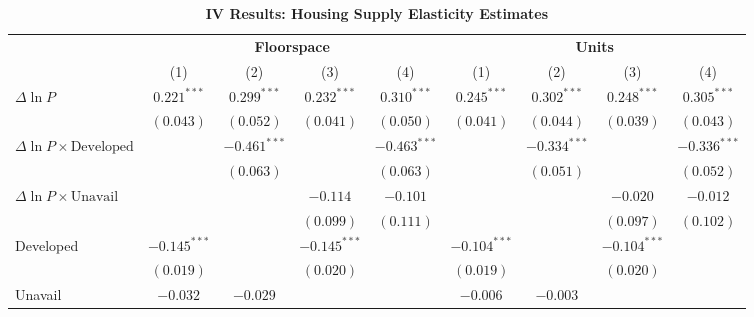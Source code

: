 
\begin{table}[H]
\caption{\textbf{IV Results: Housing Supply Elasticity Estimates}}
\begin{center}
\begin{footnotesize}
\begin{threeparttable}
\begin{tabular}{l@{} c@{} c@{} c@{} c@{} c@{} c@{} c@{} c@{}}
\toprule
 & \multicolumn{4}{c}{\textbf{Floorspace}} & \multicolumn{4}{c}{\textbf{Units}} \\
\cmidrule(lr){2-5} \cmidrule(lr){6-9}
 & (1) & (2) & (3) & (4) & (1) & (2) & (3) & (4) \\
\midrule
$\Delta\ln P$                         & $0.221^{***}$  & $0.299^{***}$  & $0.232^{***}$  & $0.310^{***}$  & $0.245^{***}$  & $0.302^{***}$  & $0.248^{***}$  & $0.305^{***}$  \\
                                      & $(0.043)$      & $(0.052)$      & $(0.041)$      & $(0.050)$      & $(0.041)$      & $(0.044)$      & $(0.039)$      & $(0.043)$      \\
$\Delta\ln P\times{\text{Developed}}$ &                & $-0.461^{***}$ &                & $-0.463^{***}$ &                & $-0.334^{***}$ &                & $-0.336^{***}$ \\
                                      &                & $(0.063)$      &                & $(0.063)$      &                & $(0.051)$      &                & $(0.052)$      \\
$\Delta\ln P\times{\text{Unavail}}$   &                &                & $-0.114$       & $-0.101$       &                &                & $-0.020$       & $-0.012$       \\
                                      &                &                & $(0.099)$      & $(0.111)$      &                &                & $(0.097)$      & $(0.102)$      \\
Developed                             & $-0.145^{***}$ &                & $-0.145^{***}$ &                & $-0.104^{***}$ &                & $-0.104^{***}$ &                \\
                                      & $(0.019)$      &                & $(0.020)$      &                & $(0.019)$      &                & $(0.020)$      &                \\
Unavail                               & $-0.032$       & $-0.029$       &                &                & $-0.006$       & $-0.003$       &                &                \\

\end{tabular}
\end{threeparttable}
\end{footnotesize}
\end{center}
\end{table}
